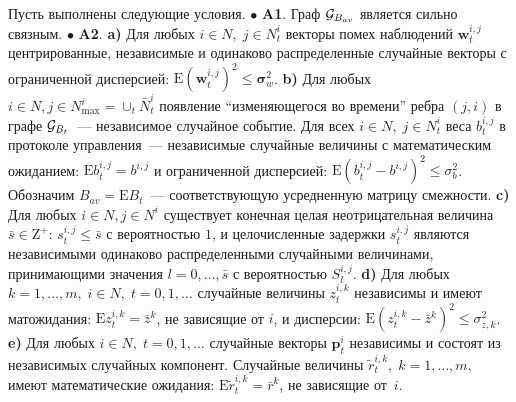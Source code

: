 \documentclass{spisok-article}
\begin{document}
Пусть
выполнены следующие условия.
\newline $\bullet$
{\bf A1}. Граф ${\cal G}_{B_{av}}$ является сильно связным.%
\newline $\bullet$
{\bf A2}. {\bf a)} Для любых $i \in N,\; j \in N_t^{i} $ векторы помех наблюдений $\mathbf w_{t}^{i, j}$ центрированные, независимые и одинаково распределенные случайные векторы с ограниченной дисперсией: $\mathrm{E} (\mathbf w_{t}^{i, j})^2\leq \mathbf \sigma_w^2$.
\newline
{\bf b)} Для любых $i \in N, j \in N^{i}_{\max}=\cup_t \bar N^{i}_{t}$ появление ``изменяющегося во времени'' ребра $(j, i)$ в графе ${\cal G}_{B_t}$~--- независимое случайное событие. Для всех  $i \in N,\; j \in N_t^i$ веса $ b_{t}^{i, j}$ в протоколе управления~--- независимые случайные величины с математическим ожиданием: $\mathrm{E} b_{t}^{i, j} = b^{i, j}$ и ограниченной дисперсией: $\mathrm{E} (b_{t}^{i, j} - b^{i, j})^2 \leq \sigma_{b}^2$.
Обозначим $B_{av}=\mathrm{E} B_{t}$~--- соответствующую усредненную матрицу смежности.
\newline
{\bf c)} Для любых $i \in N, j \in N^{i}$ существует конечная целая неотрицательная величина $\bar s \in \mathrm Z^+$: $s_{t}^{i, j} \leq \bar s$ с вероятностью $1$, и целочисленные задержки $s_{t}^{i, j} $ являются независимыми одинаково распределенными случайными величинами, принимающими значения $l=0, \ldots, \bar s$ с вероятностью $S_l^{i,j}$.
\newline
{\bf d)} Для любых  $k=1, \ldots, m,\; i \in N,\;t=0, 1, \ldots$ случайные величины $z_{t}^{i, k}$ независимы и имеют матожидания: $\mathrm{E} z_{t}^{i, k} = {\bar {z}}^k$, не зависящие от $i$, и дисперсии: $\mathrm{E} (z_{t}^{i, k} - {\bar {z}}^k)^2 \leq \sigma_{z,k}^2$.
\newline
{\bf e)} Для любых $ i \in N,\;t=0, 1, \ldots$ случайные векторы ${\mathbf {p}}_t^{i}$ независимы и состоят  из независимых случайных компонент. Случайные величины $\tilde r_{t}^{i, k}, \;k=1, \ldots, m,$ имеют математические ожидания: $\mathrm{E} \tilde r_{t}^{i, k} = {\bar {r}}^k$, не зависящие от~$i$.
\end{document}
